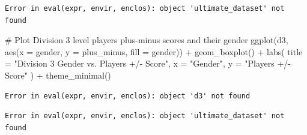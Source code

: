 \documentclass[
  letterpaper,
  DIV=11,
  numbers=noendperiod]{scrartcl}
\newenvironment{Shaded}{\begin{snugshade}}{\end{snugshade}}
\newcommand{\AttributeTok}[1]{\textcolor[rgb]{0.40,0.45,0.13}{#1}}
\newcommand{\CommentTok}[1]{\textcolor[rgb]{0.37,0.37,0.37}{#1}}
\newcommand{\FunctionTok}[1]{\textcolor[rgb]{0.28,0.35,0.67}{#1}}
\newcommand{\NormalTok}[1]{\textcolor[rgb]{0.00,0.23,0.31}{#1}}
\newcommand{\OtherTok}[1]{\textcolor[rgb]{0.00,0.23,0.31}{#1}}
\newcommand{\SpecialCharTok}[1]{\textcolor[rgb]{0.37,0.37,0.37}{#1}}
\newcommand{\StringTok}[1]{\textcolor[rgb]{0.13,0.47,0.30}{#1}}
\begin{document}
\begin{Shaded}
\end{Shaded}

\begin{verbatim}
Error in eval(expr, envir, enclos): object 'ultimate_dataset' not found
\end{verbatim}

\begin{Shaded}
\begin{Highlighting}[]
\CommentTok{\# Plot  Division 3 level player\textquotesingle{}s plus{-}minus scores and their gender}
\FunctionTok{ggplot}\NormalTok{(d3, }\FunctionTok{aes}\NormalTok{(}\AttributeTok{x =}\NormalTok{ gender, }\AttributeTok{y =}\NormalTok{ plus\_minus, }\AttributeTok{fill =}\NormalTok{ gender)) }\SpecialCharTok{+}
  \FunctionTok{geom\_boxplot}\NormalTok{() }\SpecialCharTok{+}
  \FunctionTok{labs}\NormalTok{(}
    \AttributeTok{title =} \StringTok{"Division 3 Gender vs. Player\textquotesingle{}s +/{-} Score"}\NormalTok{,}
    \AttributeTok{x =} \StringTok{"Gender"}\NormalTok{,}
    \AttributeTok{y =} \StringTok{"Player\textquotesingle{}s +/{-} Score"}
\NormalTok{  ) }\SpecialCharTok{+}
  \FunctionTok{theme\_minimal}\NormalTok{()}
\end{Highlighting}
\end{Shaded}

\begin{verbatim}
Error in eval(expr, envir, enclos): object 'd3' not found
\end{verbatim}

\begin{Shaded}
\end{Shaded}

\begin{verbatim}
Error in eval(expr, envir, enclos): object 'ultimate_dataset' not found
\end{verbatim}
\end{document}
